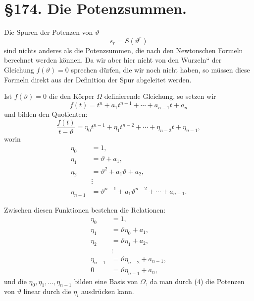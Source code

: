 \documentclass[12pt,a4paper]{article}
\theoremstyle{definition}
\begin{document}
\newpage
\section*{\S 174. Die Potenzsummen.}

Die Spuren der Potenzen von $\vartheta$
\begin{equation}
s_r = S(\vartheta^r)
\end{equation}
sind nichts anderes als die Potenzsummen, die nach den Newtonschen Formeln berechnet werden können. Da wir aber hier nicht von den \glqq Wurzeln`` der Gleichung $f(\vartheta) = 0$ sprechen dürfen, die wir noch nicht haben, so müssen diese Formeln direkt aus der Definition der Spur abgeleitet werden.

Ist $f(\vartheta) = 0$ die den Körper $\Omega$ definierende Gleichung, so setzen wir
\begin{equation}
f(t) = t^n + a_1t^{n-1} + \cdots + a_{n-1}t + a_n
\end{equation}
und bilden den Quotienten:
\[\frac{f(t)}{t - \vartheta} = \eta_0 t^{n-1} + \eta_1 t^{n-2} + \cdots + \eta_{n-2}t + \eta_{n-1},\]
worin
\begin{equation}
\begin{aligned}
\eta_0 &= 1, \\
\eta_1 &= \vartheta + a_1, \\
\eta_2 &= \vartheta^2 + a_1\vartheta + a_2, \\
&\vdots \\
\eta_{n-1} &= \vartheta^{n-1} + a_1\vartheta^{n-2} + \cdots + a_{n-1}.
\end{aligned}
\end{equation}

Zwischen diesen Funktionen bestehen die Relationen:
\begin{equation}
\begin{aligned}
\eta_0 &= 1, \\
\eta_1 &= \vartheta\eta_0 + a_1, \\
\eta_2 &= \vartheta\eta_1 + a_2, \\
&\vdots \\
\eta_{n-1} &= \vartheta\eta_{n-2} + a_{n-1}, \\
0 &= \vartheta\eta_{n-1} + a_n,
\end{aligned}
\end{equation}
und die $\eta_0, \eta_1, \ldots, \eta_{n-1}$ bilden eine Basis von $\Omega$, da man durch (4) die Potenzen von $\vartheta$ linear durch die $\eta_i$ ausdrücken kann.
\end{document}

